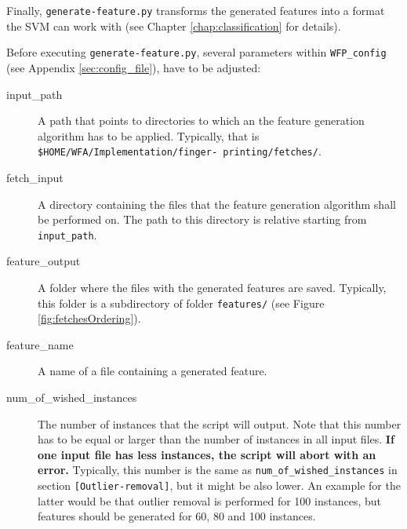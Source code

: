Finally, \texttt{generate-feature.py} transforms the generated features into a format the \ac{SVM} can work with (see Chapter \ref{chap:classification} for details).

Before executing \texttt{generate-feature.py}, several parameters within \texttt{WFP\_config} (see Appendix \ref{sec:config_file}), have to be adjusted:
\begin{description}
\item[input\_path] A path that points to directories to which an the feature generation algorithm has to be applied. Typically, that is \texttt{\$HOME/WFA/Implementation/finger- printing/fetches/}.
\item[fetch\_input] A directory containing the files that the feature generation algorithm shall be performed on. The path to this directory is relative starting from \texttt{input\_path}.
\item[feature\_output] A folder where the files with the generated features are saved. Typically, this folder is a subdirectory of folder \texttt{features/} (see Figure \ref{fig:fetchesOrdering}).
\item[feature\_name] A name of a file containing a generated feature.
\item[num\_of\_wished\_instances] The number of instances that the script will output. Note that this number has to be equal or larger than the number of instances in all input files. \textbf{If one input file has less instances, the script will abort with an error.} Typically, this number is the same as \texttt{num\_of\_wished\_instances} in section \texttt{[Outlier-removal]}, but it might be also lower. An example for the latter would be that outlier removal is performed for 100 instances, but features should be generated for 60, 80 and 100 instances.


\end{description}
